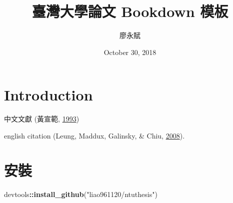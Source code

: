\documentclass[oneside]{book}
\title{臺灣大學論文 Bookdown 模板}
\author{廖永賦}
\date{October 30, 2018}
\newenvironment{Shaded}{\begin{snugshade}}{\end{snugshade}}
\newcommand{\KeywordTok}[1]{\textcolor[rgb]{0.13,0.29,0.53}{\textbf{#1}}}
\newcommand{\StringTok}[1]{\textcolor[rgb]{0.31,0.60,0.02}{#1}}
\newcommand{\OperatorTok}[1]{\textcolor[rgb]{0.81,0.36,0.00}{\textbf{#1}}}
\newcommand{\NormalTok}[1]{#1}
\begin{document}


\clearpage
{}

{}


{}



{}


{}


\clearpage
{}

{
\setcounter{tocdepth}{1}
\tableofcontents
}

\newpage

\listoftables
\newpage
\listoffigures
\newpage

\let\oldShaded=\Shaded
\let\endoldShaded=\endShaded
\renewenvironment{Shaded}{
      \begin{spacing}{1.5}\begin{oldShaded}
    }
  {
  \end{oldShaded}
  \end{spacing}
  }


\chapter{Introduction}\label{intro}

中文文獻 (黃宣範, \protect\hyperlink{ref-huangxuanfan1993}{1993})

english citation (Leung, Maddux, Galinsky, \& Chiu,
\protect\hyperlink{ref-leung2008}{2008}).

\chapter{安裝}\label{install}

\begin{Shaded}
\begin{Highlighting}[]
\NormalTok{devtools}\OperatorTok{::}\KeywordTok{install_github}\NormalTok{(}\StringTok{"liao961120/ntuthesis"}\NormalTok{)}
\end{Highlighting}
\end{Shaded}
\end{document}
